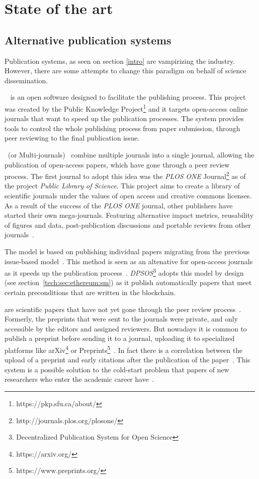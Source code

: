 \section{State of the art}
\subsection{Alternative publication systems}
\label{soa:aps}
Publication systems, as seen on section \ref{intro} are vampirizing the
industry. However, there are some attempts to change this paradigm on behalf of
science dissemination.

~\cite{willinsky2005open} is an open software designed
to facilitate the publishing process. This project was created by the Public
Knowledge Project\footnote{https://pkp.sfu.ca/about/} and it targets open-access
online journals that want to speed up the publication processes. The system
provides tools to control the whole publishing process from paper submission,
through peer reviewing to the final publication issue.

~(or Multi-journals)~\cite{binfield2013open,wellen2013open}
combine multiple journals into a single journal, allowing the publication of
open-access papers, which have gone through a peer review process. The first
journal to adopt this idea was the \emph{PLOS ONE}
Journal\footnote{http://journals.plos.org/plosone/} as of the project
\emph{Public Library of Science}. This project aims to create a library of
scientific journals under the values of open access and creative commons
licenses. As a result of the success of the \emph{PLOS ONE} journal, other
publishers have started their own mega-journals. Featuring alternative impact
metrics, reusability of figures and data, post-publication discussions and
portable reviews from other journals~\cite{bjork2015have}.

The  model is based on publishing individual papers
migrating from the previous issue-based model~\cite{anderton2013continuous}.
This method is seen as an altenative for open-access journals as it speeds up
the publication process~\cite{haymanview}. \emph{DPSOS}\footnote{Decentralized
  Publication System for Open Science} adopts this model by design (see
section~\ref{tech:sec:ethereum:sm}) as it publish automatically papers that meet
certain preconditions that are written in the blockchain.

 are scientific papers that have not yet gone through the peer
review process~\cite{harnad2003electronic}. Formerly, the preprints that were
sent to the journals were private, and only accessible by the editors and
assigned reviewers. But nowadays it is common to publish a preprint before
sending it to a journal, uploading it to specialized platforms like
arXiv\footnote{https://arxiv.org/} or
Preprints\footnote{https://www.preprints.org/}~\cite{brown2001volution}. In fact
there is a correlation between the upload of a preprint and early citations
after the publication of the paper~\cite{shuai2012scientific}. This system is a
possible solution to the cold-start problem that papers of new researchers who
enter the academic career have~\cite{sugiyama2010scholarly}.

